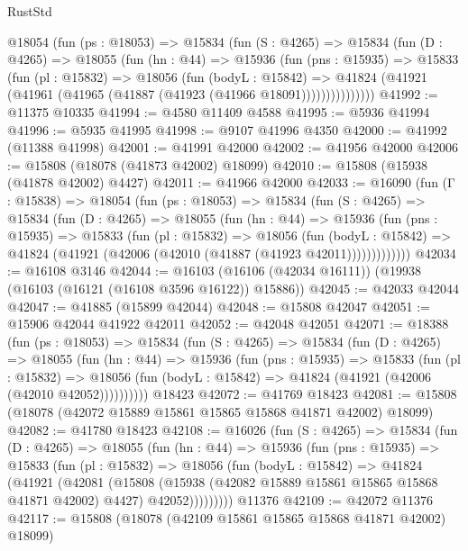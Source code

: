 \begin{lexlean}{RustStd}
\begin{coremodule}
      @18054
        (fun (ps : @18053) =>
        @15834
          (fun (S : @4265) =>
          @15834
            (fun (D : @4265) =>
            @18055
              (fun (hn : @44) =>
              @15936
                (fun (pns : @15935) =>
                @15833
                  (fun (pl : @15832) =>
                  @18056
                    (fun (bodyL : @15842) =>
                    @41824 (@41921 (@41961 (@41965 (@41887 (@41923 (@41966 @18091)))))))))))))))
@41992 := @11375 @10335
@41994 := @4580 @11409 @4588
@41995 := @5936 @41994
@41996 := @5935 @41995
@41998 := @9107 @41996 @4350
@42000 := @41992 (@11388 @41998)
@42001 := @41991 @42000
@42002 := @41956 @42000
@42006 := @15808 (@18078 (@41873 @42002) @18099)
@42010 := @15808 (@15938 (@41878 @42002) @4427)
@42011 := @41966 @42000
@42033 := @16090
    (fun (Γ : @15838) =>
    @18054
      (fun (ps : @18053) =>
      @15834
        (fun (S : @4265) =>
        @15834
          (fun (D : @4265) =>
          @18055
            (fun (hn : @44) =>
            @15936
              (fun (pns : @15935) =>
              @15833
                (fun (pl : @15832) =>
                @18056
                  (fun (bodyL : @15842) =>
                  @41824 (@41921 (@42006 (@42010 (@41887 (@41923 @42011)))))))))))))
@42034 := @16108 @3146
@42044 := @16103 (@16106 (@42034 @16111)) (@19938 (@16103 (@16121 (@16108 @3596 @16122)) @15886))
@42045 := @42033 @42044
@42047 := @41885 (@15899 @42044)
@42048 := @15808 @42047
@42051 := @15906 @42044 @41922 @42011
@42052 := @42048 @42051
@42071 := @18388
    (fun (ps : @18053) =>
    @15834
      (fun (S : @4265) =>
      @15834
        (fun (D : @4265) =>
        @18055
          (fun (hn : @44) =>
          @15936
            (fun (pns : @15935) =>
            @15833
              (fun (pl : @15832) =>
              @18056 (fun (bodyL : @15842) => @41824 (@41921 (@42006 (@42010 @42052))))))))))
    @18423
@42072 := @41769 @18423
@42081 := @15808 (@18078 (@42072 @15889 @15861 @15865 @15868 @41871 @42002) @18099)
@42082 := @41780 @18423
@42108 := @16026
    (fun (S : @4265) =>
    @15834
      (fun (D : @4265) =>
      @18055
        (fun (hn : @44) =>
        @15936
          (fun (pns : @15935) =>
          @15833
            (fun (pl : @15832) =>
            @18056
              (fun (bodyL : @15842) =>
              @41824
                (@41921
                  (@42081
                    (@15808
                      (@15938 (@42082 @15889 @15861 @15865 @15868 @41871 @42002) @4427)
                      @42052)))))))))
    @11376
@42109 := @42072 @11376
@42117 := @15808 (@18078 (@42109 @15861 @15865 @15868 @41871 @42002) @18099)

\end{coremodule}
\end{lexlean}
